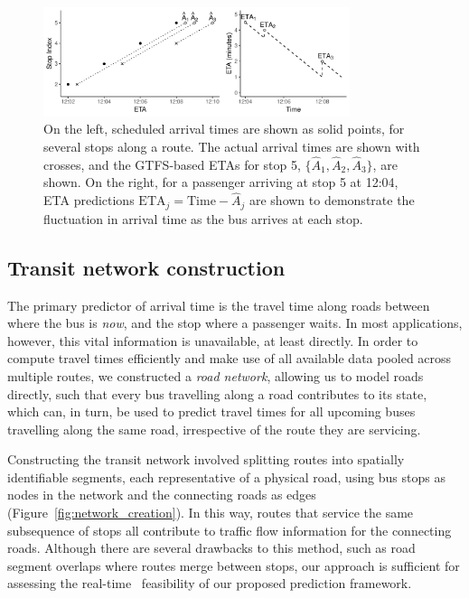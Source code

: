 \documentclass[times, doublespace]{anzsauth}
\newcommand{\rt}{real-time\ }
\begin{document}
\begin{figure}[tb]
    \centering
    \includegraphics[width=0.8\textwidth]{figures/02_gtfs_delays.pdf}
    \caption{
        On the left, scheduled arrival times are shown as solid points,
        for several stops along a route. The actual arrival times
        are shown with crosses,
        and the GTFS-based ETAs for stop 5, $\{\hat A_1, \hat A_2, \hat A_3\}$, are shown.
        On the right,
        for a passenger arriving at stop 5 at 12:04,
        ETA predictions
        $\mathrm{ETA}_j = \mathrm{Time} - \hat A_j$ are shown
        to demonstrate the fluctuation in
        arrival time as the bus arrives at each stop.
    }
    \label{fig:gtfs-delays}
\end{figure}



\subsection{Transit network construction}
\label{sec:network_build}

The primary predictor of arrival time is
the travel time along roads between where the bus is \emph{now},
and the stop where a passenger waits.
In most applications, however, this vital information is unavailable, at least directly.
In order to compute travel times efficiently
and make use of all available data pooled across multiple routes,
we constructed a \emph{road network},
allowing us to model roads directly,
such that every bus travelling along a road contributes to its state,
which can, in turn, be used to predict travel times for all upcoming buses
travelling along the same road,
irrespective of the route they are servicing.


Constructing the transit network involved splitting routes
into spatially identifiable segments,
each representative of a physical road,
using bus stops as nodes in the network
and the connecting roads as edges
(Figure~\ref{fig:network_creation}).
In this way, routes that service the same subsequence of stops
all contribute to traffic flow information for the connecting roads.
Although there are several drawbacks to this method,
such as road segment overlaps where routes merge between stops,
our approach is sufficient for assessing the \rt
feasibility of our proposed prediction framework.
\end{document}
